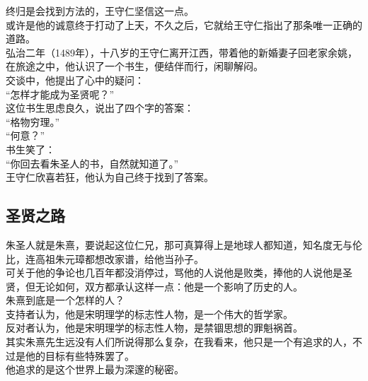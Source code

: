 \begin{multicols}{\theparacolNo}
终归是会找到方法的，王守仁坚信这一点。\\

或许是他的诚意终于打动了上天，不久之后，它就给王守仁指出了那条唯一正确的道路。\\

弘治二年（1489年），十八岁的王守仁离开江西，带着他的新婚妻子回老家余姚，在旅途之中，他认识了一个书生，便结伴而行，闲聊解闷。\\

交谈中，他提出了心中的疑问：\\

“怎样才能成为圣贤呢？”\\

这位书生思虑良久，说出了四个字的答案：\\

“格物穷理。”\\

“何意？”\\

书生笑了：\\

“你回去看朱圣人的书，自然就知道了。”\\

王守仁欣喜若狂，他认为自己终于找到了答案。\\

\subsection{圣贤之路}
朱圣人就是朱熹，要说起这位仁兄，那可真算得上是地球人都知道，知名度无与伦比，连高祖朱元璋都想改家谱，给他当孙子。\\

可关于他的争论也几百年都没消停过，骂他的人说他是败类，捧他的人说他是圣贤，但无论如何，双方都承认这样一点：他是一个影响了历史的人。\\

朱熹到底是一个怎样的人？\\

支持者认为，他是宋明理学的标志性人物，是一个伟大的哲学家。\\

反对者认为，他是宋明理学的标志性人物，是禁锢思想的罪魁祸首。\\

其实朱熹先生远没有人们所说得那么复杂，在我看来，他只是一个有追求的人，不过是他的目标有些特殊罢了。\\

他追求的是这个世界上最为深邃的秘密。\\


\end{multicols}
